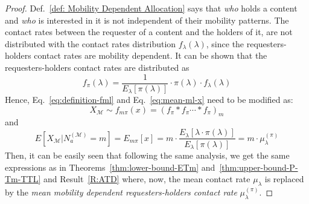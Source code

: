 \documentclass[journal]{IEEEtran}
\newcommand{\eq}[1]{Eq.~\eqref{#1}}
\newcommand{\Na}{N_{a}^{(\mathcal{M})}}
\newcommand{\XM}{{X}_{\mathcal{M}}}
\begin{document}
\begin{proof}
Def.~\ref{def: Mobility Dependent Allocation} says that \textit{who} holds a content and \textit{who} is interested in it is not independent of their mobility patterns. The contact rates between the requester of a content and the holders of it, are not distributed with the contact rates distribution $f_{\lambda}(\lambda)$, since the requesters-holders contact rates are mobility dependent. It can be shown that the requesters-holders contact rates are distributed as~\cite{pavlos-TMC-traffic}
\begin{equation}
 f_{\pi}(\lambda) = \frac{1}{E_{\lambda}[\pi(\lambda)]}\cdot \pi(\lambda)\cdot f_{\lambda}(\lambda)
\end{equation}
Hence, \eq{eq:definition-fml} and \eq{eq:mean-ml-x} need to be modified as:
\begin{equation}\label{eq:definition-fmpi}
\XM\sim f_{m\pi}(x) = \left(f_{\pi}\ast f_{\pi} \cdots \ast f_{\pi} \right)_{m}
\end{equation}
and
\begin{equation}\label{eq:mean-mpi-x}
E[\XM|\Na=m] = E_{m\pi}[x] = m\cdot \frac{E_{\lambda}[\lambda\cdot \pi(\lambda)]}{E_{\lambda}[\pi(\lambda)]}= m\cdot \mu_{\lambda}^{(\pi)}
\end{equation}
Then, it can be easily seen that following the same analysis, we get the same expressions as in Theorems~\ref{thm:lower-bound-ETm} and~\ref{thm:upper-bound-P-Tm-TTL} and Result~\ref{R:ATD} where, now, the mean contact rate $\mu_{\lambda}$ is replaced by the \textit{mean mobility dependent requesters-holders contact rate} $\mu_{\lambda}^{(\pi)}$.
\end{proof}
\end{document}
